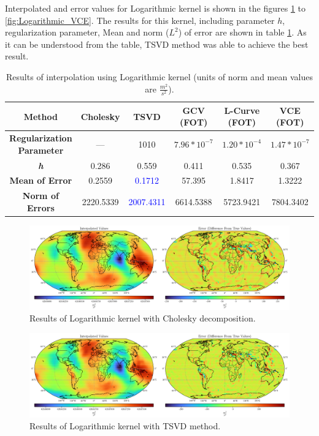 \documentclass[12pt]{article}
\begin{document}
	Interpolated and error values for Logarithmic kernel is shown in the figures \ref{fig:Logarithmic_Chol} to \ref{fig:Logarithmic_VCE}. The results for this kernel, including parameter $h$, regularization parameter, Mean and norm ($L^2$) of error are shown in table \ref{tab:Logarithmic_Results}. As it can be understood from the table, TSVD method was able to achieve the best result.
	
	\begin{table}[h!]
		\centering
		\caption{Results of interpolation using Logarithmic kernel (units of norm and mean values are $\frac{m^2}{s^2}$).}
		\vspace{0.2cm}
		\renewcommand{\arraystretch}{2}
		\begin{tabular}{c|c|c|c|c|c}
			\textbf{Method} & Cholesky & TSVD & GCV (FOT) & L-Curve (FOT) & VCE (FOT) \\
			\hline 
			\makecell{\textbf{Regularization} \\ \textbf{Parameter}} & --- & 1010 & $7.96*10^{-7}$ & $1.20*10^{-4}$ & $1.47*10^{-7}$ \\
			\hline 
			\textit{\textbf{h}} & 0.286 & 0.559 & 0.411 & 0.535 & 0.367 \\
			\hline
			\textbf{Mean of Error} & 0.2559 & \textcolor{blue}{0.1712} & 57.395 & 1.8417 & 1.3222 \\
			\hline 
			\textbf{Norm of Errors} & 2220.5339 & \textcolor{blue}{2007.4311} & 6614.5388 & 5723.9421 & 7804.3402 \\
		\end{tabular}
		\label{tab:Logarithmic_Results}
	\end{table}
	
	\begin{figure}[h!]
		\centering
		\includegraphics[width=16cm]{../Outputs/Plots/Plot_Logarithmic_Cholesky.pdf}
		\caption{Results of Logarithmic kernel with Cholesky decomposition.}
		\label{fig:Logarithmic_Chol}
	\end{figure}
	
	\begin{figure}[h!]
		\centering
		\includegraphics[width=16cm]{../Outputs/Plots/Plot_Logarithmic_TSVD.pdf}
		\caption{Results of Logarithmic kernel with TSVD method.}
		\label{fig:Logarithmic_TSVD}
	\end{figure}
	
\end{document}
